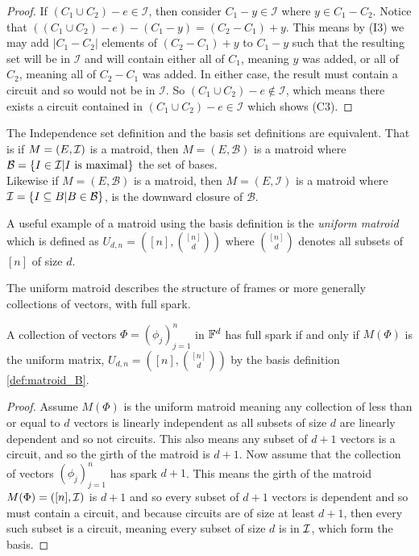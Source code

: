 {\begin{proof}
    If $(C_1\cup C_2)-e\in \mathcal{I}$, then consider $C_1-y\in\mathcal{I}$ where $y\in C_1-C_2$. Notice that $((C_1\cup C_2)-e)-(C_1-y)=(C_2-C_1)+y$. This means by (I3) we may add $|C_1-C_2|$ elements of $(C_2-C_1)+y$ to $C_1-y$ such that the resulting set will be in $\mathcal{I}$ and will contain either all of $C_1$, meaning $y$ was added, or all of $C_2$, meaning all of $C_2-C_1$ was added. In either case, the result must contain a circuit and so would not be in $\mathcal{I}$. So $(C_1\cup C_2)-e\not\in \mathcal{I}$, which means there exists a circuit contained in $(C_1\cup C_2)-e\in \mathcal{I}$ which shows (C3).
\end{proof}
\begin{thm}
\label{thm:equiv_matroid_I_B}
    The Independence set definition and the basis set definitions are equivalent. That is if $M=(E,\mathcal{I})$ is a matroid, then $M=(E,\mathcal{B})$ is a matroid where $\mathcal{B}=\{I\in\mathcal{I}| I \text{ is maximal}\}$ the set of bases.\\
    Likewise if $M=(E,\mathcal{B})$ is a matroid, then $M=(E,\mathcal{I})$ is a matroid where $\mathcal{I}=\{I\subseteq B|B\in\mathcal{B} \}$, is the downward closure of $\mathcal{B}$.
\end{thm}

\begin{example}
\label{ex:uniform_matroid}
A useful example of a matroid using the basis definition is the \textit{uniform matroid} which is defined as $U_{d,n}=([n],{[n]\choose d})$ where ${[n]\choose d}$ denotes all subsets of $[n]$ of size $d$.
\end{example}
The uniform matroid describes the structure of frames or more generally collections of vectors, with full spark.
}{}
\begin{prop}
\label{prop:full_spark_iff_uniform}
A collection of vectors $\Phi=(\phi_j)_{j=1}^n$ in $\mathbb{F}^d$ has full spark if and only if $M(\Phi)$ is the uniform matrix, $U_{d,n}=([n],{[n]\choose d})$ by the basis definition \ref{def:matroid_B}.
\end{prop}
\begin{proof}
    Assume $M(\Phi)$ is the uniform matroid meaning any collection of less than or equal to $d$ vectors is linearly independent as all subsets of size $d$ are linearly dependent and so not circuits. This also means any subset of $d+1$ vectors is a circuit, and so the girth of the matroid is $d+1$. Now assume that the collection of vectors $(\phi_j)_{j=1}^n$ has spark $d+1$. This means the girth of the matroid $M(\Phi)=([n],\mathcal{I})$ is $d+1$ and so every subset of $d+1$ vectors is dependent and so must contain a circuit, and because circuits are of size at least $d+1$, then every such subset is a circuit, meaning every subset of size $d$ is in $\mathcal{I}$, which form the basis.
\end{proof}


